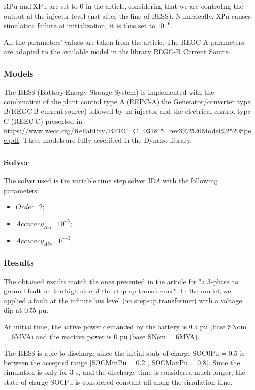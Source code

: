 \documentclass[a4paper, 12pt]{report}
\begin{document}
RPu and XPu are set to 0 in the article, considering that we are controling the output at the injector level (not after the line of BESS).
Numerically, XPu causes simulation failure at initialization, it is thus set to $10^{-6}$.

All the parameters' values are taken from the article. The REGC-A parameters are adapted to the available model in the library REGC-B Current Source.

\subsubsection{Models}

The BESS (Battery Energy Storage System) is implemented with the combination of the plant control type A (REPC-A) the Generator/converter type B(REGC-B current source) followed by an injector and the electrical control type C (REEC-C) presented in \url{https://www.wecc.org/Reliability/REEC\_C\_031815\_rev3\%2520Model\%2520Spec.pdf}.
These models are fully described in the Dyna$\omega$o library.

\subsubsection{Solver}

\par The solver used is the variable time step solver IDA with the following parameters:
\begin{itemize}
\item $Order$=2;
\item $Accuracy_{Rel}$=$10^{-5}$;
\item $Accuracy_{Abs}$=$10^{-3}$.
\end{itemize}

\subsubsection{Results}
The obtained results match the ones presented in the article for "a 3-phase to ground fault on the high-side of the step-up transformer". In the model, we applied a fault at the infinite bus level (no step-up transformer) with a voltage dip at 0.55 pu.


At initial time, the active power demanded by the battery is 0.5 pu (base SNom = 6MVA) and the reactive power is 0 pu (base SNom = 6MVA).

The BESS is able to discharge since the initial state of charge SOC0Pu = 0.5 is between the accepted range [SOCMinPu = 0.2 , SOCMaxPu = 0.8]. Since the simulation is only for 3 s, and the discharge time is considered much longer, the state of charge SOCPu is considered constant all along the simulation time.
\end{document}
